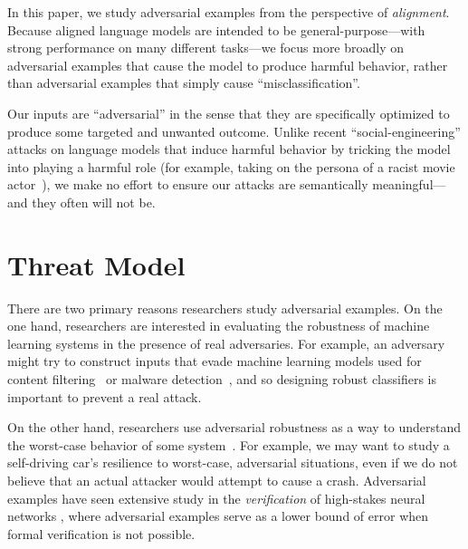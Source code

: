 \documentclass{article}
\newcommand{\pw}[1]{\textcolor{blue}{[PW: #1]}}
\renewcommand{\cite}{\citep}
\begin{document}
In this paper, we study adversarial examples from the perspective of \emph{alignment}.
%
Because aligned language models are intended to be general-purpose---with strong performance on many different tasks---we focus more broadly on adversarial examples that cause the model to produce
harmful behavior, rather than adversarial examples that simply cause ``misclassification''.
%

Our inputs are ``adversarial'' in the sense that they are specifically optimized to produce some targeted and unwanted outcome.
%
Unlike recent ``social-engineering'' attacks on language models that
induce harmful behavior by tricking the model into
playing a harmful role (for example, taking on the persona of a racist movie actor~\cite{danreddit}),
we make no effort to ensure
our attacks are semantically meaningful---and they often will not be.

\section{Threat Model}

There are two primary reasons researchers study adversarial examples.
%
On the one hand, researchers are interested in evaluating
the robustness of machine learning systems in the presence of real adversaries.
%
For example, an adversary might try to construct inputs that evade machine learning models used for
content filtering~\citep{tramer2018adblock, welbl2021challenges} or malware detection~\citep{kolosnjaji2018adversarial},
and so designing robust classifiers is important to prevent a real attack.

On the other hand, researchers use
adversarial robustness as a way to understand the worst-case
behavior of some system~\citep{szegedy2013intriguing, pei2017deepxplore}.
%
For example, we may want to study a self-driving car's resilience to worst-case, adversarial situations, 
even if we do not believe that an actual attacker would attempt to cause a crash.
%
Adversarial examples have seen extensive study in the \emph{verification} of high-stakes neural networks
\citep{wong2018provable, katz2017reluplex}, where adversarial examples serve as a lower
bound of error when formal verification is not possible.
\end{document}
